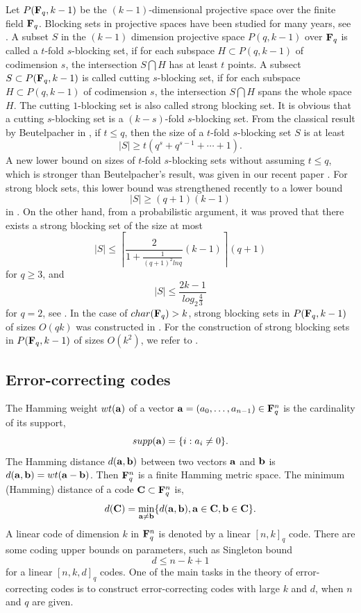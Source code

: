 \documentclass[12pt]{article}
\begin{document}
Let $P({\bf F}_q, k-1)$ be the $(k-1)$-dimensional projective space over the finite field ${\bf F}_q$. Blocking sets in projective spaces have been studied for many years, see \cite{BS,Beu,BB}. A subset $S$ in the $(k-1)$ dimension projective space $P(q,k-1)$ over ${\bf F}_q$ is called a $t$-fold $s$-blocking set, if for each subspace $H \subset P(q,k-1)$ of codimension $s$, the intersection $S \bigcap H$ has at least $t$ points. A subsect $S \subset P({\bf F}_q, k-1)$ is called cutting $s$-blocking set, if for each subspace $H \subset P(q,k-1)$ of codimension $s$, the intersection $S \bigcap H$ spans the whole space $H$. The cutting $1$-blocking set is also called strong blocking set. It is obvious that a cutting $s$-blocking set is a $(k-s)$-fold $s$-blocking set. From the classical result by Beutelpacher in \cite{Beu}, if $t \leq q$, then the size of a $t$-fold $s$-blocking set $S$ is at least $$|S| \geq t(q^s+q^{s-1}+\cdots+1).$$ A new lower bound on sizes of $t$-fold $s$-blocking sets without assuming $t \leq q$, which is stronger than Beutelpacher's result,  was given in our recent paper \cite{Pan1}. For strong block sets, this lower bound was strengthened recently to a lower bound $$|S| \geq (q+1)(k-1)$$ in \cite{Alfarano}. On the other hand, from a probabilistic argument, it was proved that there exists a strong blocking set of the size at most $$|S| \leq \left\lceil \frac{2}{1+\frac{1}{(q+1)^2ln q}}(k-1)\right\rceil (q+1)$$ for $q \geq 3$, and $$|S| \leq \frac{2k-1}{log_2\frac{4}{3}}$$ for $q=2$, see \cite{Mik,Alfarano3,Bishnoi,Hegar}. In the case of $char({\bf F}_q)>k$, strong blocking sets in $P({\bf F}_q, k-1)$ of sizes $O(qk)$ was constructed in \cite{FS}. For the construction of strong blocking sets in $P({\bf F}_q,k-1)$ of sizes $O(k^2)$, we refer to \cite{Davy,Alfarano}.\\

\subsection{Error-correcting codes}



The Hamming weight $wt({\bf a})$ of a vector ${\bf a}=(a_0, \ldots, a_{n-1}) \in {\bf F}_q^n$ is the cardinality of its support, $$supp({\bf a})=\{i: a_i \neq 0\}.$$ The Hamming distance $d({\bf a}, {\bf b})$ between two vectors ${\bf a}$ and ${\bf b}$ is $d({\bf a}, {\bf b})=wt({\bf a}-{\bf b})$. Then ${\bf F}_q^n$ is a finite Hamming metric space. The minimum (Hamming) distance of a code ${\bf C} \subset {\bf F}_q^n$ is, $$d({\bf C})=\min_{{\bf a} \neq {\bf b}} \{d({\bf a}, {\bf b}),  {\bf a} \in {\bf C}, {\bf b} \in {\bf C} \}.$$ A linear code of dimension $k$ in ${\bf F}_q^n$ is denoted by a linear $[n,k]_q$ code. There are some coding upper bounds on parameters, such as Singleton bound $$d \leq n-k+1$$ for a linear $[n,k,d]_q$ codes. One of the main tasks in the theory of error-correcting codes is to construct error-correcting codes with large $k$ and $d$, when $n$ and $q$ are given.\\
\end{document}
